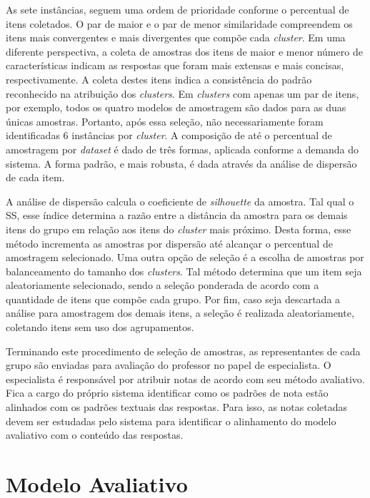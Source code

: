 As sete instâncias, seguem uma ordem de prioridade conforme o percentual de itens coletados. O par de maior e o par de menor similaridade compreendem os itens mais convergentes e mais divergentes que compõe cada \textit{cluster}. Em uma diferente perspectiva, a coleta de amostras dos itens de maior e menor número de características indicam as respostas que foram mais extensas e mais concisas, respectivamente. A coleta destes itens indica a consistência do padrão reconhecido na atribuição dos \textit{clusters}. Em \textit{clusters} com apenas um par de itens, por exemplo, todos os quatro modelos de amostragem são dados para as duas únicas amostras. Portanto, após essa seleção, não necessariamente foram identificadas 6 instâncias por \textit{cluster}. A composição de até o percentual de amostragem por \textit{dataset} é dado de três formas, aplicada conforme a demanda do sistema. A forma padrão, e mais robusta, é dada através da análise de dispersão de cada item.

A análise de dispersão calcula o coeficiente de \textit{silhouette} da amostra. Tal qual o SS, esse índice determina a razão entre a distância da amostra para os demais itens do grupo em relação aos itens do \textit{cluster} mais próximo. Desta forma, esse método incrementa as amostras por dispersão até alcançar o percentual de amostragem selecionado. Uma outra opção de seleção é a escolha de amostras por balanceamento do tamanho dos \textit{clusters}. Tal método determina que um item seja aleatoriamente selecionado, sendo a seleção ponderada de acordo com a quantidade de itens que compõe cada grupo. Por fim, caso seja descartada a análise para amostragem dos demais itens, a seleção é realizada aleatoriamente, coletando itens sem uso dos agrupamentos.

Terminando este procedimento de seleção de amostras, as representantes de cada grupo são enviadas para avaliação do professor no papel de especialista. O especialista é responsável por atribuir notas de acordo com seu método avaliativo. Fica a cargo do próprio sistema identificar como os padrões de nota estão alinhados com os padrões textuais das respostas. Para isso, as notas coletadas devem ser estudadas pelo sistema para identificar o alinhamento do modelo avaliativo com o conteúdo das respostas.

\section{Modelo Avaliativo}
\label{sec-avaliacao}

